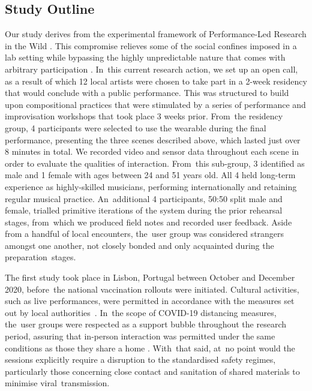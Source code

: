 
\subsection*{Study Outline}

Our study derives from the experimental framework of Performance-Led Research in the Wild \citep{benford_performance-led_2013}. This compromise relieves some of the social confines imposed in a lab setting while bypassing the highly unpredictable nature that comes with arbitrary participation \citep{heron_par_2017}. In~this current research action, we set up an open call, as a result of which 12 local artists were chosen to take part in a 2-week residency that would conclude with a public performance. This was structured to build upon compositional practices that were stimulated by a series of performance and improvisation workshops that took place 3 weeks prior. From~the residency group, 4 participants were selected to use the wearable during the final performance, presenting the three scenes described above, which lasted just over 8 minutes in total. We recorded video and sensor data throughout each scene in order to evaluate the qualities of interaction. From~this sub-group, 3 identified as male and 1 female with ages between 24 and 51 years old. All 4 held long-term experience as highly-skilled musicians, performing internationally and retaining regular musical practice. An~additional 4 participants, 50:50 split male and female, trialled primitive iterations of the system during the prior rehearsal stages, from~which we produced field notes and recorded user feedback. Aside from a handful of local encounters, the~user group was considered strangers amongst one another, not closely bonded and only acquainted during the preparation~stages.

The first study took place in Lisbon, Portugal between October and December 2020, before~the national vaccination rollouts were initiated. Cultural activities, such as live performances, were permitted in accordance with the measures set out by local authorities~\cite{direcao-geral_da_saude_dgs_covid-19_2020}. In~the scope of COVID-19 distancing measures, the~user groups were respected as a support bubble throughout the research period, assuring that in-person interaction was permitted under the same conditions as those they share a home \citep{trotter_ways_2021}. With~that said, at~no point would the sessions explicitly require a disruption to the standardised safety regimes, particularly those concerning close contact and sanitation of shared materials to minimise viral~transmission.


